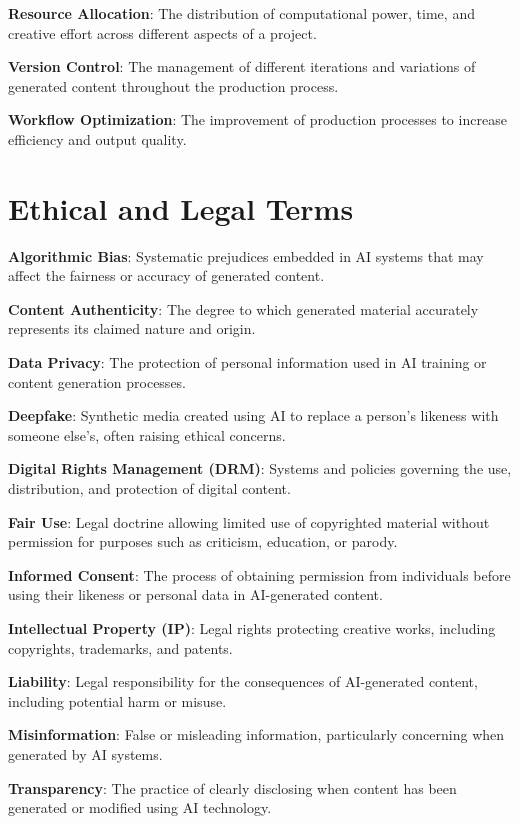 \textbf{Resource Allocation}: The distribution of computational power, time, and creative effort across different aspects of a project.

\textbf{Version Control}: The management of different iterations and variations of generated content throughout the production process.

\textbf{Workflow Optimization}: The improvement of production processes to increase efficiency and output quality.

\section{Ethical and Legal Terms}

\textbf{Algorithmic Bias}: Systematic prejudices embedded in AI systems that may affect the fairness or accuracy of generated content.

\textbf{Content Authenticity}: The degree to which generated material accurately represents its claimed nature and origin.

\textbf{Data Privacy}: The protection of personal information used in AI training or content generation processes.

\textbf{Deepfake}: Synthetic media created using AI to replace a person's likeness with someone else's, often raising ethical concerns.

\textbf{Digital Rights Management (DRM)}: Systems and policies governing the use, distribution, and protection of digital content.

\textbf{Fair Use}: Legal doctrine allowing limited use of copyrighted material without permission for purposes such as criticism, education, or parody.

\textbf{Informed Consent}: The process of obtaining permission from individuals before using their likeness or personal data in AI-generated content.

\textbf{Intellectual Property (IP)}: Legal rights protecting creative works, including copyrights, trademarks, and patents.

\textbf{Liability}: Legal responsibility for the consequences of AI-generated content, including potential harm or misuse.

\textbf{Misinformation}: False or misleading information, particularly concerning when generated by AI systems.

\textbf{Transparency}: The practice of clearly disclosing when content has been generated or modified using AI technology.

